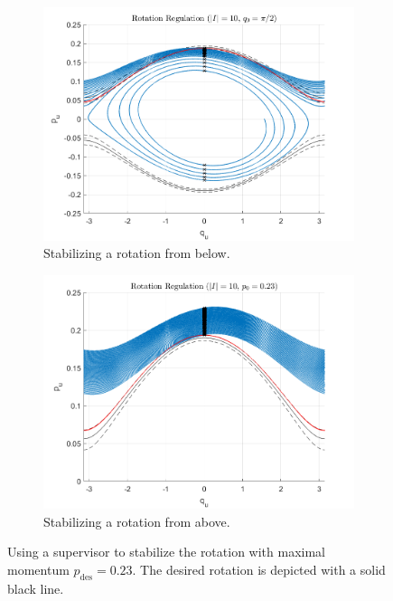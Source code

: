 \documentclass[journal,twoside,onecolumn,draftclsnofoot,web]{ieeecolor}
\begin{document}
{\begin{figure}
    \centering
    \begin{subfigure}[t]{0.49\linewidth}
        \includegraphics[width=\linewidth]{acrobot_rot_orbit_1.png}
        \caption{Stabilizing a rotation from below.}
        \label{fig:acrobot-rot-reg-in}
    \end{subfigure}
    \begin{subfigure}[t]{0.49\linewidth}
        \includegraphics[width=\linewidth]{acrobot_rot_orbit_2.png}
        \caption{Stabilizing a rotation from above.}
        \label{fig:acrobot-rot-reg-diss}
    \end{subfigure}
    \caption{Using a supervisor to stabilize the rotation with maximal momentum
    \(p_\text{des} = 0.23\). The desired rotation is depicted with a solid black
    line.}
    \label{fig:acrobot-rot-reg}
\end{figure}

}
\end{document}
